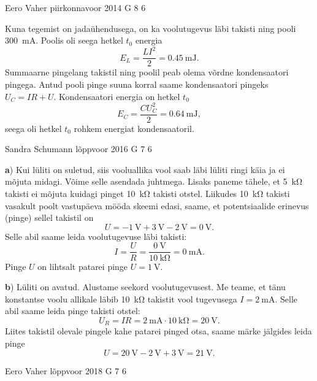 \documentclass[11pt, twoside]{article}
\begin{document}
{%
{Eero Vaher} %
{piirkonnavoor} %
{2014} %
{G 8} %
{6} %
{

\ifSolution
Kuna tegemist on jadaühendusega, on ka voolutugevus läbi takisti ning pooli \SI{300}{\milli\ampere}. Poolis oli seega hetkel $t_0$ energia 
\[
E_L=\frac{LI^2}{2}=\SI{0.45}{\milli\joule}.
\]
Summaarne pingelang takistil ning poolil peab olema võrdne kondensaatori pingega. Antud pooli pinge suuna korral saame kondensaatori pingeks $U_C=IR+U$. Kondensaatori energia on hetkel $t_0$ 
\[
E_C=\frac{CU_C^2}{2}=\SI{0.64}{\milli\joule},
\]
seega oli hetkel $t_0$ rohkem energiat kondensaatoril. 
\fi
}

{Sandra Schumann} %
{lõppvoor} %
{2016} %
{G 7} %
{6} %
{

\ifSolution
{\bf a}) Kui lüliti on suletud, siis vooluallika vool saab läbi lüliti ringi käia ja ei mõjuta midagi. Võime selle asendada juhtmega. Lisaks paneme tähele, et \SI{5}{\kilo\ohm} takisti ei mõjuta kuidagi pinget \SI{10}{\kilo\ohm} takisti otstel. Liikudes \SI{10}{\kilo\ohm} takisti vasakult poolt vastupäeva mööda skeemi edasi, saame, et potentsiaalide erinevus (pinge) sellel takistil on
\[
U = -\SI{1}{\volt} + \SI{3}{\volt} - \SI{2}{\volt} = \SI{0}{\volt}.
\]
Selle abil saame leida voolutugevuse läbi takisti:
\[
I = \frac U R = \frac {\SI{0}{\volt}} {\SI{10}{\kilo\ohm}} = \SI{0}{\milli\ampere}.
\]
Pinge $U$ on lihtsalt patarei pinge $U=\SI{1}{\volt}$.
	
{\bf b}) Lüliti on avatud. Alustame seekord voolutugevusest. Me teame, et tänu konstantse voolu allikale läbib \SI{10}{\kilo\ohm} takistit vool tugevusega $I = \SI{2}{\milli\ampere}$. Selle abil saame leida pinge takisti otstel:
\[
U_R = IR = \SI{2}{\milli\ampere} \cdot \SI{10}{\kilo\ohm} = \SI{20}{\volt}.
\]
Liites takistil olevale pingele kahe patarei pinged otsa, saame märke jälgides leida pinge
\[
U = \SI{20}{\volt} - \SI{2}{\volt} + \SI{3}{\volt} = \SI{21}{\volt}.
\]
\fi
}

{Eero Vaher} %
{lõppvoor} %
{2018} %
{G 7} %
{6} %
{

}}
\end{document}
